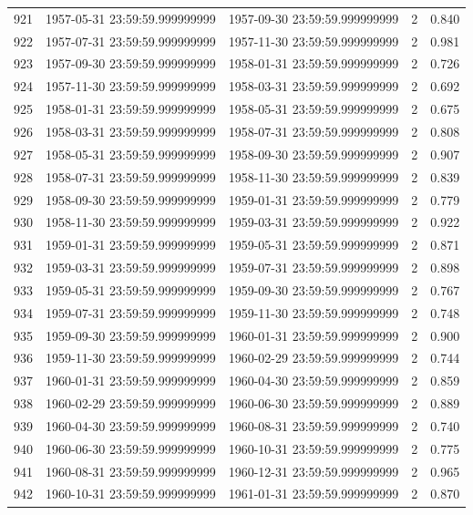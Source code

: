 \begin{table}
\begin{tabular}{lcccc}
921 & 1957-05-31 23:59:59.999999999 & 1957-09-30 23:59:59.999999999 & 2 & 0.840 \\
922 & 1957-07-31 23:59:59.999999999 & 1957-11-30 23:59:59.999999999 & 2 & 0.981 \\
923 & 1957-09-30 23:59:59.999999999 & 1958-01-31 23:59:59.999999999 & 2 & 0.726 \\
924 & 1957-11-30 23:59:59.999999999 & 1958-03-31 23:59:59.999999999 & 2 & 0.692 \\
925 & 1958-01-31 23:59:59.999999999 & 1958-05-31 23:59:59.999999999 & 2 & 0.675 \\
926 & 1958-03-31 23:59:59.999999999 & 1958-07-31 23:59:59.999999999 & 2 & 0.808 \\
927 & 1958-05-31 23:59:59.999999999 & 1958-09-30 23:59:59.999999999 & 2 & 0.907 \\
928 & 1958-07-31 23:59:59.999999999 & 1958-11-30 23:59:59.999999999 & 2 & 0.839 \\
929 & 1958-09-30 23:59:59.999999999 & 1959-01-31 23:59:59.999999999 & 2 & 0.779 \\
930 & 1958-11-30 23:59:59.999999999 & 1959-03-31 23:59:59.999999999 & 2 & 0.922 \\
931 & 1959-01-31 23:59:59.999999999 & 1959-05-31 23:59:59.999999999 & 2 & 0.871 \\
932 & 1959-03-31 23:59:59.999999999 & 1959-07-31 23:59:59.999999999 & 2 & 0.898 \\
933 & 1959-05-31 23:59:59.999999999 & 1959-09-30 23:59:59.999999999 & 2 & 0.767 \\
934 & 1959-07-31 23:59:59.999999999 & 1959-11-30 23:59:59.999999999 & 2 & 0.748 \\
935 & 1959-09-30 23:59:59.999999999 & 1960-01-31 23:59:59.999999999 & 2 & 0.900 \\
936 & 1959-11-30 23:59:59.999999999 & 1960-02-29 23:59:59.999999999 & 2 & 0.744 \\
937 & 1960-01-31 23:59:59.999999999 & 1960-04-30 23:59:59.999999999 & 2 & 0.859 \\
938 & 1960-02-29 23:59:59.999999999 & 1960-06-30 23:59:59.999999999 & 2 & 0.889 \\
939 & 1960-04-30 23:59:59.999999999 & 1960-08-31 23:59:59.999999999 & 2 & 0.740 \\
940 & 1960-06-30 23:59:59.999999999 & 1960-10-31 23:59:59.999999999 & 2 & 0.775 \\
941 & 1960-08-31 23:59:59.999999999 & 1960-12-31 23:59:59.999999999 & 2 & 0.965 \\
942 & 1960-10-31 23:59:59.999999999 & 1961-01-31 23:59:59.999999999 & 2 & 0.870 \\

\end{tabular}
\end{table}
